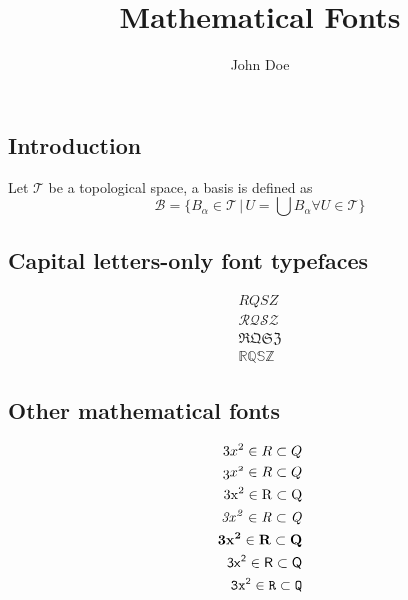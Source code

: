 \documentclass{article}
\author{John Doe}
\title{Mathematical Fonts}
\begin{document}
	\maketitle
	\subsection*{Introduction}
	Let \( \mathcal{T} \) be a topological space, a basis is defined as
	\[
	\mathcal{B} = \{B_{\alpha} \in \mathcal{T}\, |\,  U = \bigcup B_{\alpha} \forall U \in \mathcal{T} \}
	\]
	\subsection*{Capital letters-only font typefaces}
	\begin{align*}
		RQSZ \\
		\mathcal{RQSZ} \\
		\mathfrak{RQSZ} \\
		\mathbb{RQSZ}
    \end{align*}	
	\subsection*{Other mathematical fonts}
	\begin{align*}
		3x^2 \in R \subset Q \\
		\mathnormal{3x^2 \in R \subset Q} \\
		\mathrm{3x^2 \in R \subset Q} \\
		\mathit{3x^2 \in R \subset Q} \\
		\mathbf{3x^2 \in R \subset Q} \\
		\mathsf{3x^2 \in R \subset Q} \\
		\mathtt{3x^2 \in R \subset Q}
	\end{align*}	
	
\end{document}
